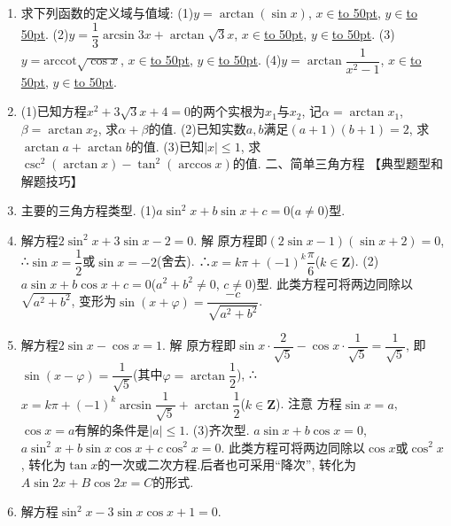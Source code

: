 \documentclass[10pt,a4paper]{article}
\newcommand{\blank}[1]{\underline{\hbox to #1pt{}}}
\begin{document}
\begin{enumerate}[1.]
{}{}
\item 求下列函数的定义域与值域:
(1)$y=\arctan (\sin x)$, $x\in$\blank{50}, $y\in$\blank{50}.
(2)$y=\dfrac 13\arcsin 3x+\arctan \sqrt 3x$, $x\in$\blank{50}, $y\in$\blank{50}.
(3)$y=\mathrm{arccot} \sqrt {\cos x}$, $x\in$\blank{50}, $y\in$\blank{50}.
(4)$y=\arctan \dfrac 1{x^2-1}$, $x\in$\blank{50}, $y\in$\blank{50}.
\item (1)已知方程$x^2+3\sqrt 3x+4=0$的两个实根为$x_1$与$x_2$, 记$\alpha =\arctan x_1$, $\beta =\arctan x_2$, 求$\alpha +\beta$的值.
(2)已知实数$a,b$满足$(a+1)(b+1)=2$, 求$\arctan a+\arctan b$的值.
(3)已知$|x|\le 1$, 求$\csc ^2(\arctan x)-\tan ^2(\arccos x)$的值.
二、简单三角方程
【典型题型和解题技巧】
\item 主要的三角方程类型.
(1)$a\sin ^2x+b\sin x+c=0$($a\ne 0$)型.
\item 解方程$2\sin ^2x+3\sin x-2=0$.
解  原方程即$(2\sin x-1)(\sin x+2)=0$, ∴$\sin x=\dfrac 12$或$\sin x=-2$(舍去).
∴$x=k\pi +(-1)^k\dfrac{\pi }6$($k\in \mathbf{Z}$).
(2)$a\sin x+b\cos x+c=0$($a^2+b^2\ne 0$, $c\ne 0$)型.
此类方程可将两边同除以$\sqrt {a^2+b^2}$, 变形为$\sin (x+\varphi)=\dfrac{-c}{\sqrt {a^2+b^2}}$.
\item 解方程$2\sin x-\cos x=1$.
解  原方程即$\sin x\cdot \dfrac 2{\sqrt 5}-\cos x\cdot \dfrac 1{\sqrt 5}=\dfrac 1{\sqrt 5}$, 即$\sin (x-\varphi)=\dfrac 1{\sqrt 5}$(其中$\varphi =\arctan \dfrac 12$),
∴$x=k\pi +(-1)^k\arcsin \dfrac 1{\sqrt 5}+\arctan \dfrac 12$($k\in \mathbf{Z}$).
注意  方程$\sin x=a$, $\cos x=a$有解的条件是$|a|\le 1$.
(3)齐次型.
$a\sin x+b\cos x=0$, $a\sin ^2x+b\sin x\cos x+c\cos ^2x=0$.
此类方程可将两边同除以$\cos x$或$\cos ^2x$, 转化为$\tan x$的一次或二次方程.后者也可采用``降次'', 转化为$A\sin 2x+B\cos 2x=C$的形式.
\item 解方程$\sin ^2x-3\sin x\cos x+1=0$.

\end{enumerate}
\end{document}
